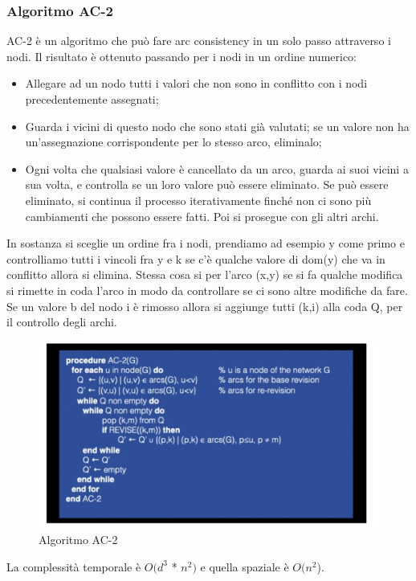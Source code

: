 \subsubsection{Algoritmo AC-2}
AC-2 è un algoritmo che può fare arc consistency in un solo passo attraverso i nodi. Il risultato è ottenuto passando per i nodi in un ordine numerico:
\begin{itemize}
    \item Allegare ad un nodo tutti i valori che non sono in conflitto con i nodi precedentemente assegnati;
    \item Guarda i vicini di questo nodo che sono stati già valutati; se un valore non ha un'assegnazione corrispondente per lo stesso arco, eliminalo;
    \item Ogni volta che qualsiasi valore è cancellato da un arco, guarda ai suoi vicini a sua volta, e controlla se un loro valore può essere eliminato. Se può essere eliminato, si continua il processo iterativamente finché non ci sono più cambiamenti che possono essere fatti. Poi si prosegue con gli altri archi.
\end{itemize}
In sostanza si sceglie un ordine fra i nodi, prendiamo ad esempio y come primo e controlliamo tutti i vincoli fra y e k se c'è qualche valore di dom(y) che va in conflitto allora si elimina. Stessa cosa si per l'arco (x,y) se si fa qualche modifica si rimette in coda l'arco in modo da controllare se ci sono altre modifiche da fare. Se un valore b del nodo i è rimosso allora si aggiunge tutti (k,i) alla coda Q, per il controllo degli archi.
\begin{figure}[H]
    \centering
    \includegraphics[width=13cm, keepaspectratio]{img/Cap3/ac-2.png}
    \caption{Algoritmo AC-2}
\end{figure}

La complessità temporale è $O(d^3$ * $n^2)$ e quella spaziale è $O(n^2$).

